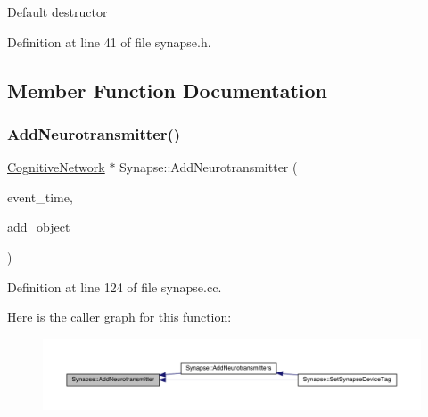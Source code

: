 Default destructor 

Definition at line 41 of file synapse.\+h.



\subsection{Member Function Documentation}
\mbox{\label{class_synapse_a76b96e3f71f9e7b0ba6b80166c3883f7}} 
\subsubsection{\texorpdfstring{Add\+Neurotransmitter()}{AddNeurotransmitter()}}
{\footnotesize\ttfamily \hyperlink{class_cognitive_network}{Cognitive\+Network} $\ast$ Synapse\+::\+Add\+Neurotransmitter (\begin{DoxyParamCaption}\item[{std\+::chrono\+::time\+\_\+point$<$ \hyperlink{universe_8h_a0ef8d951d1ca5ab3cfaf7ab4c7a6fd80}{Clock} $>$}]{event\+\_\+time,  }\item[{\hyperlink{class_cognitive_network}{Cognitive\+Network} $\ast$}]{add\+\_\+object }\end{DoxyParamCaption})}



Definition at line 124 of file synapse.\+cc.

Here is the caller graph for this function\+:\nopagebreak
\begin{figure}[H]
\begin{center}
\leavevmode
\includegraphics[width=350pt]{class_synapse_a76b96e3f71f9e7b0ba6b80166c3883f7_icgraph}
\end{center}
\end{figure}
\mbox{\label{class_synapse_a5ad01cc92c00d790b44472156065786e}} 
